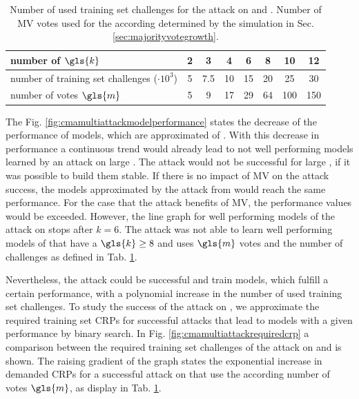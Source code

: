 \begin{table}[ht]
\centering
\begin{tabular}{|l|c|c|c|c|c|c|c|}
\hline
number of $\gls{k}$ & 2 & 3 & 4 & 6 & 8 & 10 & 12\\
\hline
number of training set challenges ($\cdot 10^3$) & 5 & 7.5 & 10 & 15 & 20 & 25 & 30\\
\hline
number of votes $\gls{m}$ & 5 & 9 & 17 & 29 & 64 & 100 & 150\\
\hline
\end{tabular}
\caption[Number of votes and challenges used for \acs{CMA-ES} attack]{Number of used training set challenges for the attack on \xpufs and \mxpufs. Number of \ac{MV} votes used for the according \mxpufs determined by the simulation in Sec. \ref{sec:majorityvotegrowth}.}
\label{tab:cmamultinumbervotes}
\end{table}

The Fig. \ref{fig:cmamultiattackmodelperformance} states the decrease of the performance of models, which are approximated of \xpufs.
With this decrease in performance a continuous trend would already lead to not well performing models learned by an attack on large \xpufs.
The attack would not be successful for large \xpufs, if it was possible to build them stable.
If there is no impact of \ac{MV} on the attack success, the models approximated by the attack from \mxpufs would reach the same performance.
For the case that the attack benefits of \ac{MV}, the performance values would be exceeded.
However, the line graph for well performing models of the attack on \mxpufs stops after $k = 6$.
The attack was not able to learn well performing models of \mxpufs that have a $\gls{k} \ge 8$ and uses $\gls{m}$ votes and the number of challenges as defined in Tab. \ref{tab:cmamultinumbervotes}.

Nevertheless, the attack could be successful and train models, which fulfill a certain performance, with a polynomial increase in the number of used training set challenges.
To study the success of the attack on \mxpufs, we approximate the required training set \acp{CRP} for successful attacks that lead to models with a given performance by binary search.
In Fig. \ref{fig:cmamultiattackrequiredcrp} a comparison between the required training set challenges of the attack on \xpufs and \mxpufs is shown.
The raising gradient of the graph states the exponential increase in demanded \acp{CRP} for a successful attack on \mxpufs that use the according number of votes $\gls{m}$, as display in Tab. \ref{tab:cmamultinumbervotes}.

